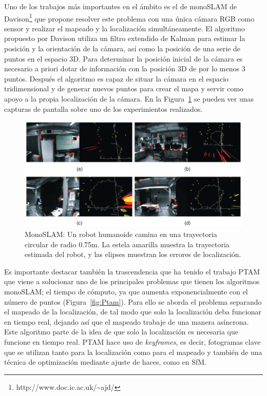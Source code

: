 Uno de los trabajos más importantes en el ámbito es el de monoSLAM de Davison\footnote{http://www.doc.ic.ac.uk/\textasciitilde ajd/} \parencite{Reference5} que propone resolver este problema con una única cámara RGB como sensor y realizar el mapeado y la localización simultáneamente. El algoritmo propuesto por Davison utiliza un filtro extendido de Kalman para estimar la posición y la orientación de la cámara, así como la posición de una serie de puntos en el espacio 3D. Para determinar la posición inicial de la cámara es necesario a priori dotar de información con la posición 3D de por lo menos 3 puntos. Después el algoritmo es capaz de situar la cámara en el espacio tridimensional y de generar nuevos puntos para crear el mapa y servir como apoyo a la propia localización de la cámara. En la Figura~\ref{fig:Monoslam} se pueden ver unas capturas de pantalla sobre uno de los experimientos realizados.

\begin{figure}[th]
\centering
\includegraphics[scale=0.35]{Figures/monoslam.png}
\decoRule
\caption[MonoSlam]{MonoSLAM: Un robot humanoide camina en una trayectoria circular de radio 0.75m. La estela amarilla muestra la trayectoria estimada del robot, y las elipses muestran los errores de localización.}
\label{fig:Monoslam}
\end{figure}

Es importante destacar también la trascendencia que ha tenido el trabajo PTAM \parencite{Reference6} que viene a solucionar uno de los principales problemas que tienen los algoritmos monoSLAM; el tiempo de cómputo, ya que aumenta exponencialmente con el número de puntos (Figura~\ref{fig:Ptam}). Para ello se aborda el problema separando el mapeado de la localización, de tal modo que solo la localización deba funcionar en tiempo real, dejando así que el mapeado trabaje de una manera asíncrona. Este algoritmo parte de la idea de que solo la localización es necesaria que funcione en tiempo real. PTAM hace uso de \textit{keyframes}, es decir, fotogramas clave que se utilizan tanto para la localización como para el mapeado y también de una técnica de optimización mediante ajuste de haces, como en SfM.

